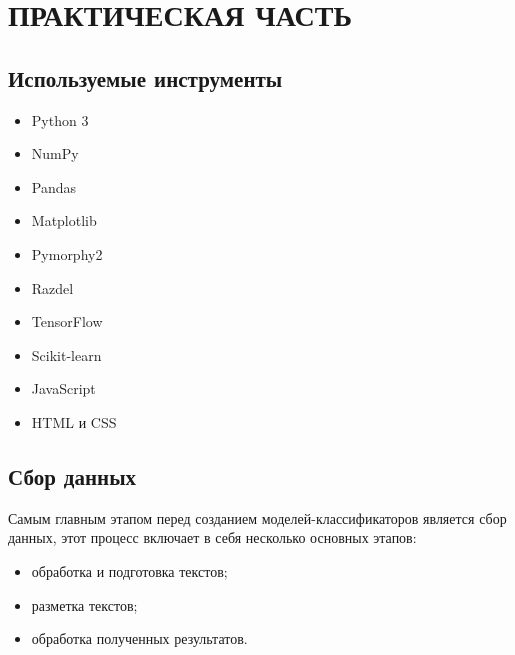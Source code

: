 \section{ПРАКТИЧЕСКАЯ ЧАСТЬ}


\subsection{Используемые инструменты}

\begin{itemize}
 \item Python 3


 \item NumPy


 \item Pandas


 \item Matplotlib



 \item Pymorphy2


 \item Razdel



 \item TensorFlow



 \item Scikit-learn



 \item JavaScript


 \item HTML и CSS



\end{itemize}














\subsection{Сбор данных}


Самым главным этапом перед созданием моделей-классификаторов является сбор данных, этот процесс включает в себя несколько основных этапов:

\bigskip
\begin{itemize}
 \item обработка и подготовка текстов;
 \item разметка текстов;
 \item обработка полученных результатов.
\end{itemize}

